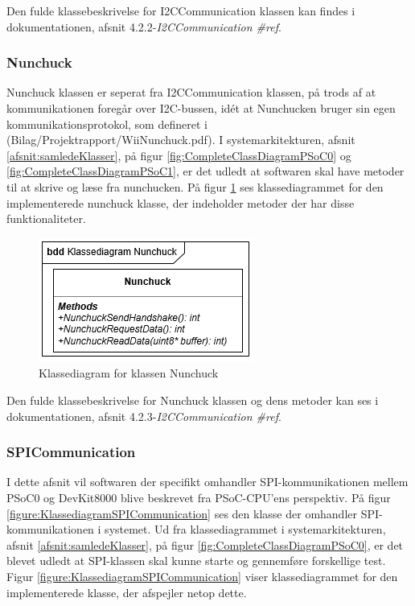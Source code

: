 \noindent Den fulde klassebeskrivelse for I2CCommunication klassen kan findes i dokumentationen, afsnit 4.2.2-\textit{I2CCommunication \#ref}.

\subsubsection{Nunchuck}
\label{afsnit:nunchuckDI}
Nunchuck klassen er seperat fra I2CCommunication klassen, på trods af at kommunikationen foregår over I2C-bussen, idét at Nunchucken bruger sin egen kommunikationsprotokol, som defineret i (Bilag/Projektrapport/WiiNunchuck.pdf). I systemarkitekturen, afsnit \ref{afsnit:samledeKlasser}, på figur \ref{fig:CompleteClassDiagramPSoC0} og \ref{fig:CompleteClassDiagramPSoC1}, er det udledt at softwaren skal have metoder til at skrive og læse fra nunchucken. På figur \ref{figure:NunchuckKlassediagram} ses klassediagrammet for den implementerede nunchuck klasse, der indeholder metoder der har disse funktionaliteter.

\begin{figure}[H]
	\centering
	\includegraphics[]{DesignOgImplementering/images/nunchuck}
	\caption{Klassediagram for klassen Nunchuck}
	\label{figure:NunchuckKlassediagram}
\end{figure}

\noindent Den fulde klassebeskrivelse for Nunchuck klassen og dens metoder kan ses i dokumentationen, afsnit 4.2.3-\textit{I2CCommunication \#ref}.

\subsubsection{SPICommunication}
\label{afsnit:SPIcommunication}
I dette afsnit vil softwaren der specifikt omhandler SPI-kommunikationen mellem PSoC0 og DevKit8000 blive beskrevet fra PSoC-CPU'ens perspektiv. På figur \ref{figure:KlassediagramSPICommunication} ses den klasse der omhandler SPI-kommunikationen i systemet. Ud fra klassediagrammet i systemarkitekturen, afsnit \ref{afsnit:samledeKlasser}, på figur \ref{fig:CompleteClassDiagramPSoC0}, er det blevet udledt at SPI-klassen skal kunne starte og gennemføre forskellige test. Figur \ref{figure:KlassediagramSPICommunication} viser klassediagrammet for den implementerede klasse, der afspejler netop dette.

